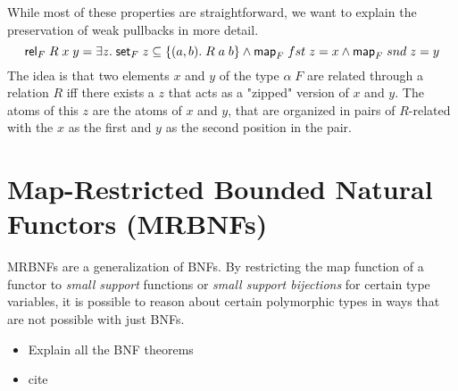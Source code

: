     While most of these properties are straightforward, we want to explain the preservation of weak pullbacks in more detail.
    \begin{equation}
      \text{\textsf{rel}}_F\; R\; x\; y = \exists z.\; \text{\textsf{set}}_F\; z \subseteq \{(a, b).\; R\; a\; b \} \land 
        \text{\textsf{map}}_F\; fst\; z = x \land \text{\textsf{map}}_F\; snd\; z = y \label{eq:WP}
    \end{equation}
    The idea is that two elements $x$ and $y$ of the type $\alpha\; F$ are related through a relation $R$ iff there exists a $z$ that acts as a "zipped" version of $x$ and $y$. The atoms of this $z$ are the atoms of $x$ and $y$, that are organized in pairs of $R$-related with the $x$ as the first and $y$ as the second position in the pair.

  \section{Map-Restricted Bounded Natural Functors (MRBNFs)}
    \acp{MRBNF} are a generalization of \acp{BNF}. By restricting the \textsf{map} function of a functor to \textit{small support} functions or \textit{small support bijections} for certain type variables, it is possible to reason about certain polymorphic types in ways that are not possible with just \acp{BNF}. 
  \begin{itemize}
    \item Explain all the BNF theorems
    \item cite \cite{blanchette2019bindings}
  \end{itemize}

